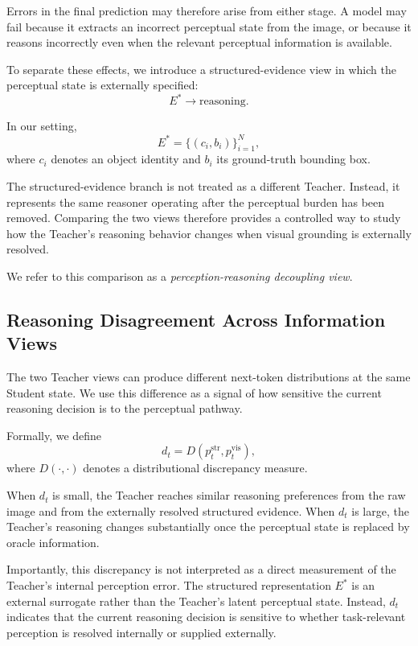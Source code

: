 Errors in the final prediction may therefore arise from either stage.
A model may fail because it extracts an incorrect perceptual state from the image, or because it reasons incorrectly even when the relevant perceptual information is available.

To separate these effects, we introduce a structured-evidence view in which the perceptual state is externally specified:
\[
E^*
\rightarrow
\text{reasoning}.
\]

In our setting,
\[
E^*
=
\{(c_i,b_i)\}_{i=1}^{N},
\]
where $c_i$ denotes an object identity and $b_i$ its ground-truth bounding box.

The structured-evidence branch is not treated as a different Teacher.
Instead, it represents the same reasoner operating after the perceptual burden has been removed.
Comparing the two views therefore provides a controlled way to study how the Teacher's reasoning behavior changes when visual grounding is externally resolved.

We refer to this comparison as a \emph{perception-reasoning decoupling view}.

\subsection{Reasoning Disagreement Across Information Views}

The two Teacher views can produce different next-token distributions at the same Student state.
We use this difference as a signal of how sensitive the current reasoning decision is to the perceptual pathway.

Formally, we define
\[
d_t
=
D
\left(
p_t^{\mathrm{str}},
p_t^{\mathrm{vis}}
\right),
\]
where $D(\cdot,\cdot)$ denotes a distributional discrepancy measure.

When $d_t$ is small, the Teacher reaches similar reasoning preferences from the raw image and from the externally resolved structured evidence.
When $d_t$ is large, the Teacher's reasoning changes substantially once the perceptual state is replaced by oracle information.

Importantly, this discrepancy is not interpreted as a direct measurement of the Teacher's internal perception error.
The structured representation $E^*$ is an external surrogate rather than the Teacher's latent perceptual state.
Instead, $d_t$ indicates that the current reasoning decision is sensitive to whether task-relevant perception is resolved internally or supplied externally.

